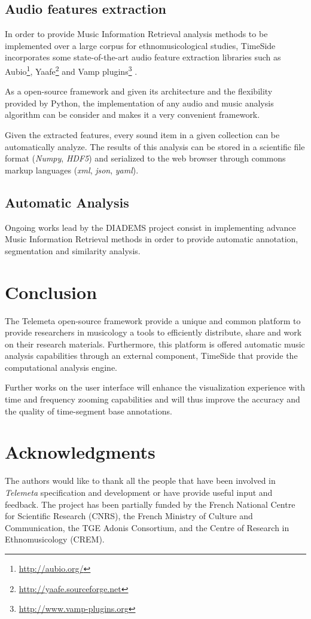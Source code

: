 \documentclass{paper}
\begin{document}
\subsection{Audio features extraction}
In order to provide Music Information Retrieval analysis methods to be implemented over a large corpus for ethnomusicological studies, TimeSide incorporates some state-of-the-art audio feature extraction libraries such as Aubio\footnote{\url{http://aubio.org/}}, Yaafe\footnote{\url{http://yaafe.sourceforge.net}} and Vamp plugins\footnote{ \url{http://www.vamp-plugins.org}} \cite{brossierPhD,yaafe_ISMIR2010,vamp-plugins}.

As a open-source framework and given its architecture and the flexibility provided by Python, the implementation of any audio and music analysis algorithm can be consider and makes it a very convenient framework.

Given the extracted features, every sound item in a given collection can be automatically analyze. The results of this analysis can be stored in a scientific file format (\emph{Numpy}, \emph{HDF5}) and serialized to the web browser through commons markup languages (\emph{xml}, \emph{json}, \emph{yaml}).


\subsection{Automatic Analysis}
Ongoing works lead by the DIADEMS project consist in implementing advance Music Information Retrieval methods in order to provide automatic annotation, segmentation and similarity analysis.

\section{Conclusion}

The Telemeta open-source framework provide a unique and common platform to provide researchers in musicology a tools to efficiently distribute, share and work on their research materials. Furthermore, this platform is offered automatic music analysis capabilities through an external component, TimeSide that provide the computational analysis engine.

Further works on the user interface will enhance the visualization experience with time and frequency zooming capabilities and will thus improve the accuracy and the quality of time-segment base annotations.



\pagebreak

\section*{Acknowledgments} 
{\small The authors would like to thank all the people that have been involved in \emph{Telemeta} specification and development or have provide useful input and feedback. 
The project has been partially funded by the French National Centre for Scientific Research (CNRS), the French Ministry of Culture and Communication, the TGE Adonis Consortium, and the Centre of Research in Ethnomusicology (CREM).}




\end{document}
